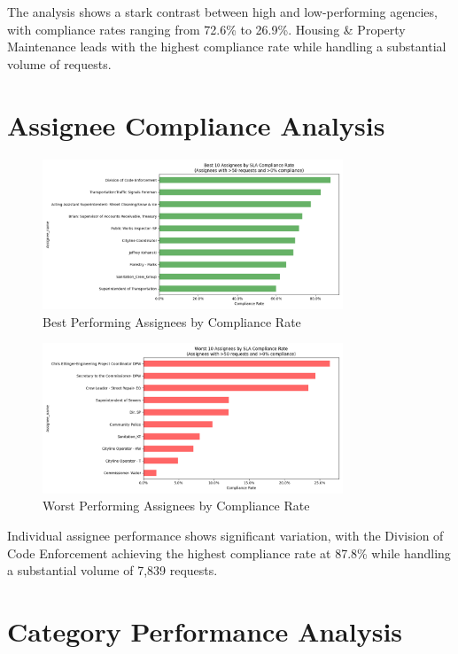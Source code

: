 \documentclass[12pt]{report}
\begin{document}
The analysis shows a stark contrast between high and low-performing agencies, with compliance rates ranging from 72.6\% to 26.9\%. Housing \& Property Maintenance leads with the highest compliance rate while handling a substantial volume of requests.

\section{Assignee Compliance Analysis}

\begin{figure}[H]
\centering
\includegraphics[width=0.8\textwidth]{best_performers_assignee}
\caption{Best Performing Assignees by Compliance Rate}
\label{fig:best_assignees}
\end{figure}

\begin{figure}[H]
\centering
\includegraphics[width=0.8\textwidth]{worst_performers_assignee}
\caption{Worst Performing Assignees by Compliance Rate}
\label{fig:worst_assignees}
\end{figure}

Individual assignee performance shows significant variation, with the Division of Code Enforcement achieving the highest compliance rate at 87.8\% while handling a substantial volume of 7,839 requests.

\section{Category Performance Analysis}
\end{document}
